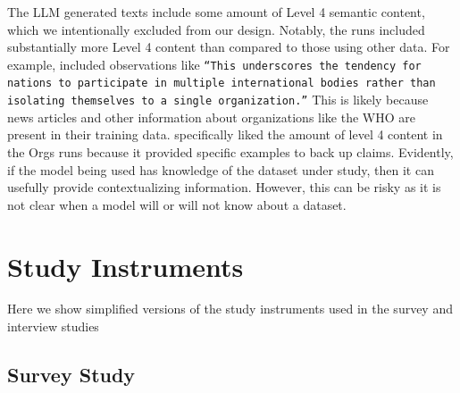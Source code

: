 \documentclass{egpubl}
\begin{document}
The LLM generated texts include some amount of Level 4 semantic content, which we intentionally excluded from our design.
Notably, the  runs included substantially more Level 4 content than compared to those using other data.
For example,  included observations like \texttt{``This underscores the tendency for nations to participate in multiple international bodies rather than isolating themselves to a single organization.''}
This is likely because news articles and other information about organizations like the WHO are present in their training data.
\colabName{} specifically liked the amount of level 4 content in the Orgs runs because it provided specific examples to back up claims.
Evidently, if the model being used has knowledge of the dataset under study, then it can usefully provide contextualizing information. However, this can be risky as it is not clear when a model will or will not know about a dataset.





























\section{Study Instruments}
\label{sec:instruments}

Here we show simplified versions of the study instruments used in the survey and interview studies

\subsection{Survey Study}
\end{document}
